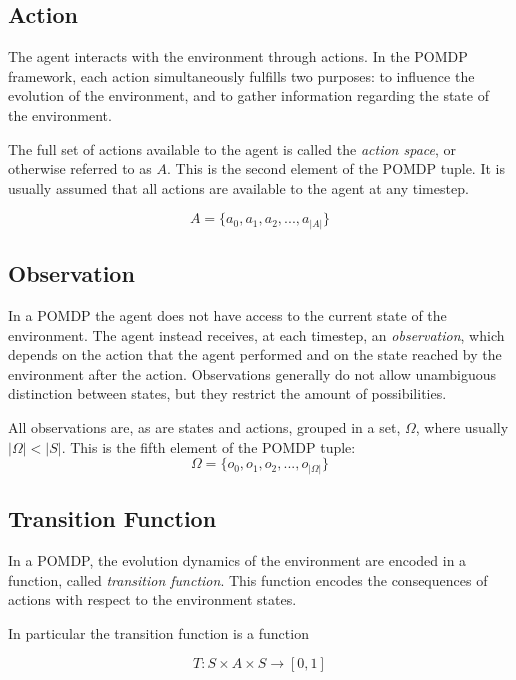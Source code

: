 \subsection{Action}

The agent interacts with the environment through actions. In the POMDP framework, each action
simultaneously fulfills two purposes: to influence the evolution of the environment, and to gather
information regarding the state of the environment.

The full set of actions available to the agent is called the \textit{action space}, or otherwise
referred to as $A$. This is the second element of the POMDP tuple. It is usually assumed that all
actions are available to the agent at any timestep.

\[ A = \{ a_0, a_1, a_2, ..., a_{|A|} \} \]

\subsection{Observation}

In a POMDP the agent does not have  access to the current state of the environment. The agent instead
receives, at each timestep, an \textit{observation}, which depends on the action that the agent
performed and on the state reached by the environment after the action. Observations generally do
not allow unambiguous distinction between states, but they restrict the amount of possibilities.

All observations are, as are states and actions, grouped in a set, $\Omega$, where usually $|\Omega| <
|S|$. This is the fifth element of the POMDP tuple:
\[ \Omega = \{ o_0, o_1, o_2, ..., o_{|\Omega|} \} \]

\subsection{Transition Function}

In a POMDP, the evolution dynamics of the environment are encoded in a function, called
\textit{transition function}. This function encodes the consequences of actions with respect to the
environment states.

In particular the transition function is a function

\[ T: S\times A \times S \rightarrow [0,1] \]

